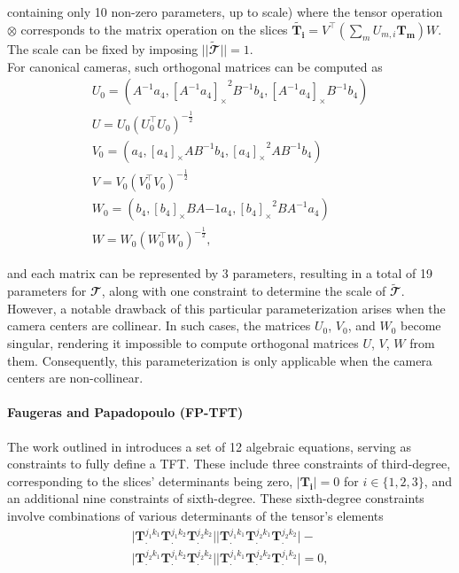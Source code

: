 containing only 10 non-zero parameters, up to scale) where the tensor operation \( \otimes \) corresponds to the matrix operation on the slices \( \bm{\widetilde{T_i}} = V^\top (\sum_{m}U_{m,i}\bm{T_m}) W \). The scale can be fixed by imposing \( || \bm{\widetilde{\mathbfcal{T}}} || = 1 \).\\

For canonical cameras, such orthogonal matrices can be computed as
\begin{equation}
	\begin{gathered}
		U_0 = (A^{-1}a_4, {[A^{-1}a_4]_{\times}}^2B^{-1}b_4, [A^{-1}a_4]_{\times}B^{-1}b_4)\\
		U = U_0(U_0^\top U_0)^{-\frac{1}{2}}\\
		V_0 = (a_4, [a_4]_{\times}AB^{-1}b_4, {[a_4]_{\times}}^2AB^{-1}b_4)\\
		V = V_0(V_0^\top V_0)^{-\frac{1}{2}}\\
		W_0 = (b_4, [b_4]_{\times}BA{-1}a_4, {[b_4]_{\times}}^2BA^{-1}a_4)\\
		W = W_0(W_0^\top W_0)^{-\frac{1}{2}},
	\end{gathered}
\end{equation}

and each matrix can be represented by 3 parameters, resulting in a total of 19 parameters for \( \mathbfcal{T} \), along with one constraint to determine the scale of \( \bm{\widetilde{\mathbfcal{T}}} \).\\

However, a notable drawback of this particular parameterization arises when the camera centers are collinear. In such cases, the matrices \( U_0 \), \( V_0 \), and \( W_0 \) become singular, rendering it impossible to compute orthogonal matrices \( U \), \( V \), \( W \) from them. Consequently, this parameterization is only applicable when the camera centers are non-collinear.

\paragraph{Faugeras and Papadopoulo (\acs{FP-TFT})}
The work outlined in \cite{7-faugeras-papadopoulo-param} introduces a set of 12 algebraic equations, serving as constraints to fully define a \acs{TFT}. These include three constraints of third-degree, corresponding to the slices' determinants being zero, \( \vert\bm{T_i}\vert = 0 \) for \( i \in \{1, 2, 3\} \), and an additional nine constraints of sixth-degree. These sixth-degree constraints involve combinations of various determinants of the tensor's elements
\begin{equation}
	\begin{gathered}
		\vert \bm{T}_.^{{j_1}{k_1}}\bm{T}_.^{{j_1}{k_2}}\bm{T}_.^{{j_2}{k_2}} \vert \vert \bm{T}_.^{{j_1}{k_1}}\bm{T}_.^{{j_2}{k_1}}\bm{T}_.^{{j_2}{k_2}} \vert -\\
		\vert \bm{T}_.^{{j_2}{k_1}}\bm{T}_.^{{j_1}{k_2}}\bm{T}_.^{{j_2}{k_2}} \vert \vert \bm{T}_.^{{j_1}{k_1}}\bm{T}_.^{{j_2}{k_2}}\bm{T}_.^{{j_1}{k_2}} \vert = 0,
	\end{gathered}
\end{equation}

